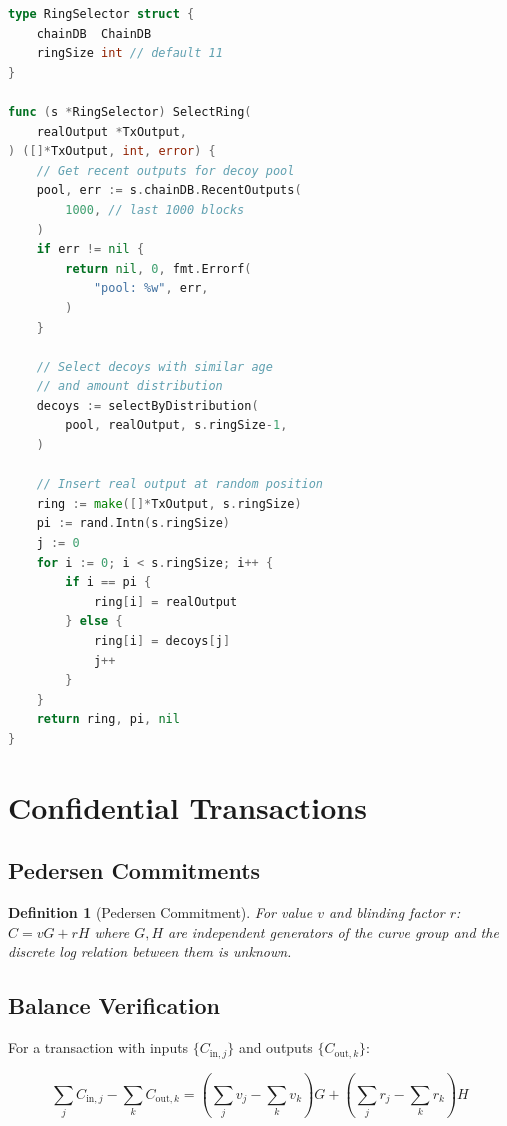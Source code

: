 \documentclass[11pt,a4paper]{article}
\newtheorem{definition}{Definition}[section]
\begin{document}
\begin{lstlisting}[language=Go,caption={Ring Member Selection}]
type RingSelector struct {
    chainDB  ChainDB
    ringSize int // default 11
}

func (s *RingSelector) SelectRing(
    realOutput *TxOutput,
) ([]*TxOutput, int, error) {
    // Get recent outputs for decoy pool
    pool, err := s.chainDB.RecentOutputs(
        1000, // last 1000 blocks
    )
    if err != nil {
        return nil, 0, fmt.Errorf(
            "pool: %w", err,
        )
    }

    // Select decoys with similar age
    // and amount distribution
    decoys := selectByDistribution(
        pool, realOutput, s.ringSize-1,
    )

    // Insert real output at random position
    ring := make([]*TxOutput, s.ringSize)
    pi := rand.Intn(s.ringSize)
    j := 0
    for i := 0; i < s.ringSize; i++ {
        if i == pi {
            ring[i] = realOutput
        } else {
            ring[i] = decoys[j]
            j++
        }
    }
    return ring, pi, nil
}
\end{lstlisting}

\section{Confidential Transactions}
\label{sec:confidential}

\subsection{Pedersen Commitments}

\begin{definition}[Pedersen Commitment]
    For value $v$ and blinding factor $r$:
    $C = v G + r H$
    where $G, H$ are independent generators of the curve group and
    the discrete log relation between them is unknown.
\end{definition}

\subsection{Balance Verification}

For a transaction with inputs $\{C_{\mathrm{in},j}\}$ and outputs
$\{C_{\mathrm{out},k}\}$:

\[
    \sum_j C_{\mathrm{in},j} - \sum_k C_{\mathrm{out},k}
    = (\sum_j v_j - \sum_k v_k) G
    + (\sum_j r_j - \sum_k r_k) H
\]
\end{document}
